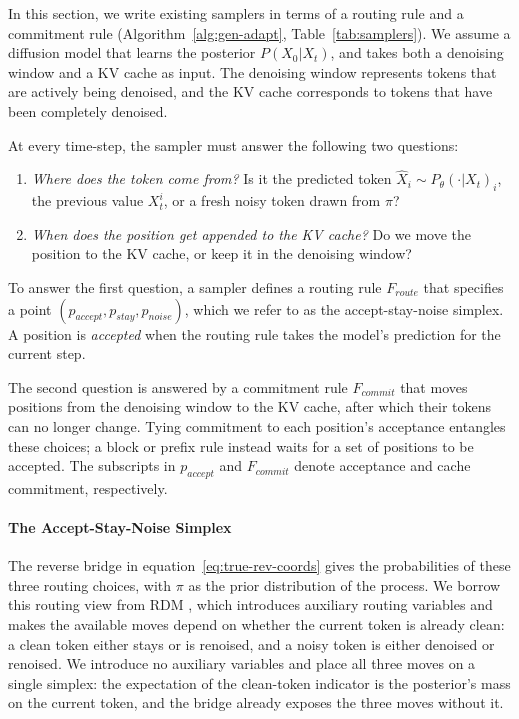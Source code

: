 In this section, we write existing samplers in terms of a routing rule and a commitment rule (Algorithm~\ref{alg:gen-adapt}, Table~\ref{tab:samplers}).
We assume a diffusion model that learns the posterior $P(X_0 | X_t)$, and takes both a denoising window and a KV cache as input.
The denoising window represents tokens that are actively being denoised, and the KV cache corresponds to tokens that have been completely denoised.

At every time-step, the sampler must answer the following two questions:
\begin{enumerate}
    \item \textit{Where does the token come from?} Is it the predicted token $\hat{X}_i \sim P_{\theta}(\cdot | X_t)_i$, the previous value $X_t^i$, or a fresh noisy token drawn from $\pi$?
    \item \textit{When does the position get appended to the KV cache?} Do we move the position to the KV cache, or keep it in the denoising window?
\end{enumerate}

To answer the first question, a sampler defines a routing rule $F_{route}$ that specifies a point $(p_{accept},\allowbreak p_{stay},\allowbreak p_{noise})$, which we refer to as the accept-stay-noise simplex.
A position is \emph{accepted} when the routing rule takes the model's prediction for the current step.

The second question is answered by a commitment rule $F_{commit}$ that moves positions from the denoising window to the KV cache, after which their tokens can no longer change.
Tying commitment to each position's acceptance entangles these choices; a block or prefix rule instead waits for a set of positions to be accepted.
The subscripts in $p_{accept}$ and $F_{commit}$ denote acceptance and cache commitment, respectively.




\paragraph{The Accept-Stay-Noise Simplex}
The reverse bridge in equation~\ref{eq:true-rev-coords} gives the probabilities of these three routing choices, with $\pi$ as the prior distribution of the process.
We borrow this routing view from RDM \citep{zheng2023reparameterized}, which introduces auxiliary routing variables and makes the available moves depend on whether the current token is already clean: a clean token either stays or is renoised, and a noisy token is either denoised or renoised.
We introduce no auxiliary variables and place all three moves on a single simplex: the expectation of the clean-token indicator is the posterior's mass on the current token, and the bridge already exposes the three moves without it.

